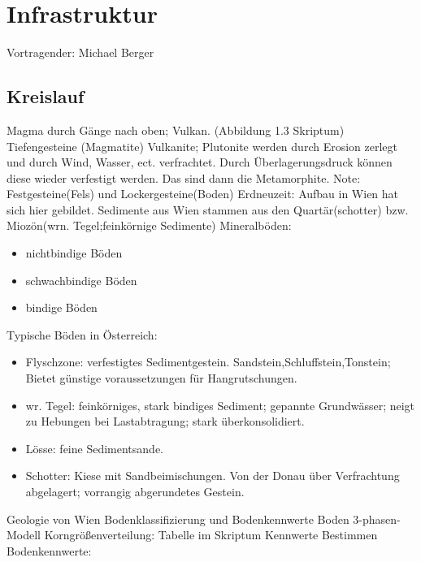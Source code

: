 \section{Infrastruktur}
Vortragender: Michael Berger\newline
\subsection{Kreislauf}
Magma durch Gänge nach oben; Vulkan. (Abbildung 1.3 Skriptum)\newline
Tiefengesteine (Magmatite) \newline
Vulkanite; Plutonite\newline
werden durch Erosion zerlegt und durch Wind, Wasser, ect. verfrachtet. Durch Überlagerungsdruck können diese wieder verfestigt werden. Das sind dann die Metamorphite.\newline
Note: Festgesteine(Fels) und Lockergesteine(Boden)\newline
\newline
Erdneuzeit: Aufbau in Wien hat sich hier gebildet. Sedimente aus Wien stammen aus den Quartär(schotter) bzw. Miozön(wrn. Tegel;feinkörnige Sedimente)\newline
Mineralböden: 
\begin{itemize}
	\item nichtbindige Böden
	\item schwachbindige Böden
	\item bindige Böden
\end{itemize}
Typische Böden in Österreich:\newline
\begin{itemize}
	\item Flyschzone: verfestigtes Sedimentgestein. Sandstein,Schluffstein,Tonstein; Bietet günstige voraussetzungen für Hangrutschungen.
	\item wr. Tegel: feinkörniges, stark bindiges Sediment; gepannte Grundwässer; neigt zu Hebungen bei Lastabtragung; stark überkonsolidiert.
	\item Lösse: feine Sedimentsande. 
	\item Schotter: Kiese mit Sandbeimischungen. Von der Donau über Verfrachtung abgelagert; vorrangig abgerundetes Gestein. 
\end{itemize}
Geologie von Wien\newline\newline
Bodenklassifizierung und Bodenkennwerte\newline
Boden 3-phasen-Modell\newline
Korngrößenverteilung:\newline
Tabelle im Skriptum\newline
Kennwerte Bestimmen\newline
Bodenkennwerte:
